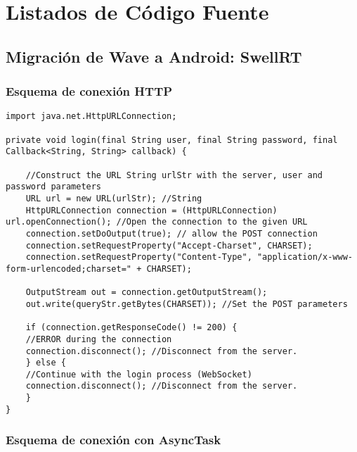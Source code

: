 \newpage
\thispagestyle{sectioned}

\appendix
\chapter{Listados de Código Fuente}

\section{Migración de Wave a Android: SwellRT}

\subsection{Esquema de conexión HTTP}\label{ssec:codeHTTP}

	  \begin{lstlisting}[frame=single]	  
import java.net.HttpURLConnection;

private void login(final String user, final String password, final Callback<String, String> callback) {
  
    //Construct the URL String urlStr with the server, user and password parameters
    URL url = new URL(urlStr); //String 
    HttpURLConnection connection = (HttpURLConnection) url.openConnection(); //Open the connection to the given URL 
    connection.setDoOutput(true); // allow the POST connection
    connection.setRequestProperty("Accept-Charset", CHARSET);
    connection.setRequestProperty("Content-Type", "application/x-www-form-urlencoded;charset=" + CHARSET);

    OutputStream out = connection.getOutputStream(); 
    out.write(queryStr.getBytes(CHARSET)); //Set the POST parameters

    if (connection.getResponseCode() != 200) {
	//ERROR during the connection
	connection.disconnect(); //Disconnect from the server.
    } else {
	//Continue with the login process (WebSocket)
	connection.disconnect(); //Disconnect from the server.
    }		      
}	    
	  \end{lstlisting}  
	  
\subsection{Esquema de conexión con AsyncTask}\label{ssec:codeAsynctask}	  
	  
